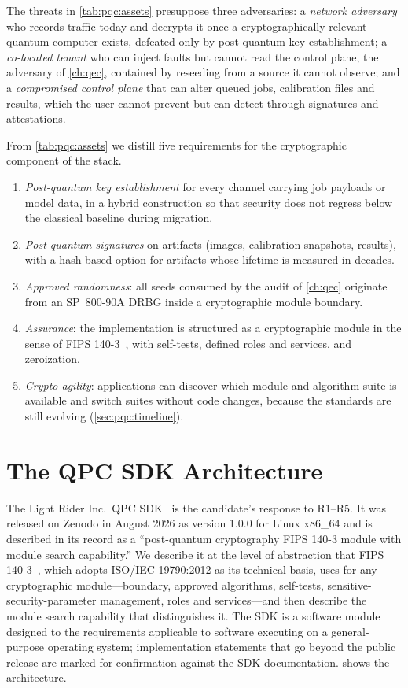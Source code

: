 The threats in \cref{tab:pqc:assets} presuppose three adversaries: a \emph{network adversary} who records traffic today and decrypts it once a cryptographically relevant quantum computer exists, defeated only by post-quantum key establishment; a \emph{co-located tenant} who can inject faults but cannot read the control plane, the adversary of \cref{ch:qec}, contained by reseeding from a source it cannot observe; and a \emph{compromised control plane} that can alter queued jobs, calibration files and results, which the user cannot prevent but can detect through signatures and attestations.

From \cref{tab:pqc:assets} we distill five requirements for the cryptographic component of the stack.
\begin{enumerate}
\item[R1] \emph{Post-quantum key establishment} for every channel carrying job payloads or model data, in a hybrid construction so that security does not regress below the classical baseline during migration.
\item[R2] \emph{Post-quantum signatures} on artifacts (images, calibration snapshots, results), with a hash-based option for artifacts whose lifetime is measured in decades.
\item[R3] \emph{Approved randomness}: all seeds consumed by the audit of \cref{ch:qec} originate from an SP~800-90A DRBG inside a cryptographic module boundary.
\item[R4] \emph{Assurance}: the implementation is structured as a cryptographic module in the sense of FIPS 140-3~\cite{nist2019fips1403}, with self-tests, defined roles and services, and zeroization.
\item[R5] \emph{Crypto-agility}: applications can discover which module and algorithm suite is available and switch suites without code changes, because the standards are still evolving (\cref{sec:pqc:timeline}).
\end{enumerate}

\section{The QPC SDK Architecture}\label{sec:pqc:sdk}

The Light Rider Inc.\ QPC SDK~\cite{guo2026lightriderqpc} is the candidate's response to R1--R5. It was released on Zenodo in August 2026 as version 1.0.0 for Linux x86\_64 and is described in its record as a ``post-quantum cryptography FIPS 140-3 module with module search capability.'' We describe it at the level of abstraction that FIPS 140-3~\cite{nist2019fips1403}, which adopts ISO/IEC 19790:2012 as its technical basis, uses for any cryptographic module---boundary, approved algorithms, self-tests, sensitive-security-parameter management, roles and services---and then describe the module search capability that distinguishes it. The SDK is a software module designed to the requirements applicable to software executing on a general-purpose operating system; implementation statements that go beyond the public release are marked for confirmation against the SDK documentation.  shows the architecture.

